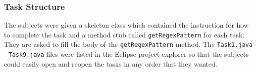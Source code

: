 \documentclass[10pt, conference, compsocconf]{IEEEtran}
\begin{document}
%
%	
%		
%		
%		
%		
%		
%		
%		
%		
%		
%		
%	
%	
%		
%		
%		
%		
%	
%
\subsubsection{Task Structure}

The subjects were given a skeleton class which contained the instruction for how to complete the task and a method stub called \texttt{getRegexPattern} for each task. They are asked to fill the body of the \texttt{getRegexPattern} method. The \texttt{Task1.java} - \texttt{Task9.java} files were listed in the Eclipse project explorer so that the subjects could easily open and reopen the tasks in any order that they wanted.
\end{document}
